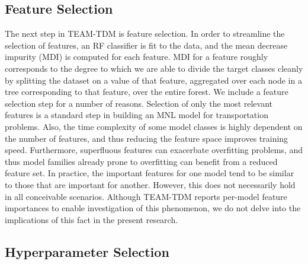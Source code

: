 \documentclass[conference]{IEEEtran}
\begin{document}
\subsection{Feature Selection} \label{subsection:selection}

The next step in TEAM-TDM is feature selection.
 In order to streamline the selection of features, an RF classifier is fit to the data, and the mean decrease impurity (MDI) \cite{louppe2013understanding} is computed for each feature.
 MDI for a feature roughly corresponds to the degree to which we are able to divide the target classes cleanly by splitting the dataset on a value of that feature, aggregated over each node in a tree corresponding to that feature, over the entire forest.
 We include a feature selection step for a number of reasons.
 Selection of only the most relevant features is a standard step in building an MNL model for transportation problems.
 Also, the time complexity of some model classes is highly dependent on the number of features, and thus reducing the feature space improves training speed.
 Furthermore, superfluous features can exacerbate overfitting problems, and thus model families already prone to overfitting can benefit from a reduced feature set.
 In practice, the important features for one model tend to be similar to those that are important for another.
 However, this does not necessarily hold in all conceivable scenarios.
 Although TEAM-TDM reports per-model feature importances to enable investigation of this phenomenon, we do not delve into the implications of this fact in the present research.

\subsection{Hyperparameter Selection} \label{subsection:hyperparameters}
\end{document}
